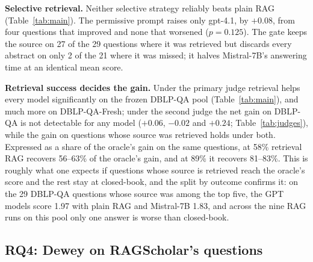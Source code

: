 \documentclass[conference]{IEEEtran}
\newcommand{\dq}{DBLP-QA}
\newcommand{\fresh}{DBLP-QA-Fresh}
\begin{document}
\textbf{Selective retrieval.} Neither selective strategy reliably beats plain RAG (Table~\ref{tab:main}).
The permissive prompt raises only gpt-4.1, by $+0.08$, from four questions that improved and none that
worsened ($p=0.125$). The gate keeps the source on 27 of the 29 questions where it was retrieved but
discards every abstract on only 2 of the 21 where it was missed; it halves Mistral-7B's answering time at
an identical mean score.

\textbf{Retrieval success decides the gain.} Under the primary judge retrieval helps every model
significantly on the frozen \dq{} pool (Table~\ref{tab:main}), and much more on \fresh{}; under the second
judge the net gain on \dq{} is not detectable for any model ($+0.06$, $-0.02$ and $+0.24$;
Table~\ref{tab:judges}), while the gain on questions whose source was retrieved holds under both.
Expressed as a share of the oracle's gain on the same questions, at 58\% retrieval RAG
recovers 56--63\% of the oracle's gain, and at 89\% it recovers 81--83\%. This is roughly what one expects
if questions whose source is retrieved reach the oracle's score and the rest stay at closed-book, and the
split by outcome confirms it: on the 29 \dq{} questions whose source was among the top five, the GPT
models score 1.97 with plain RAG and Mistral-7B 1.83, and across the nine RAG runs on this pool only one
answer is worse than closed-book.

\subsection{RQ4: Dewey on RAGScholar's questions}
\label{sec:rq4}
\end{document}

